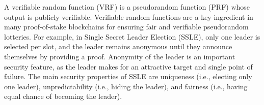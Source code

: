 

\def\eprintsmallskip{\smallskip}{}%
A verifiable random function (VRF) is a pseudorandom function (PRF) whose output is publicly verifiable.
Verifiable random functions are a key ingredient in many proof-of-stake blockchains for ensuring fair and verifiable pseudorandom lotteries.
For example, in Single Secret Leader Election (SSLE), only one leader is selected per slot, and the
leader remains anonymous until they announce themselves by providing a proof.
Anonymity of the leader is an important security feature, as the leader makes for an attractive target and single point of failure.
The main security properties of SSLE are uniqueness (i.e., electing only one leader), unpredictability (i.e., hiding the leader), and fairness (i.e., having equal chance of becoming the leader).

